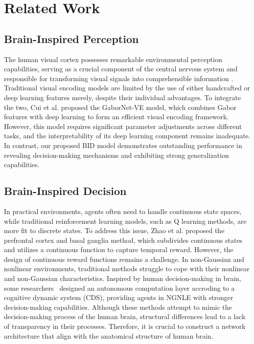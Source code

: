 \documentclass[preprint,12pt]{elsarticle}
\begin{document}
\section{Related Work}

\subsection{Brain-Inspired Perception}
\hspace{1pc}The human visual cortex possesses remarkable environmental perception capabilities, serving as a crucial component of the central nervous system and responsible for transforming visual signals into comprehensible information \cite{9134376}. 
Traditional visual encoding models are limited by the use of either handcrafted or deep learning features merely, despite their individual advantages\cite{kubilius2019brain}. 
To integrate the two, Cui et al. \cite{8574054} proposed the GaborNet-VE model, which combines Gabor features with deep learning to form an efficient visual encoding framework. 
However, this model requires significant parameter adjustments across different tasks, and the interpretability of its deep learning component remains inadequate\cite{liao2021statistical}. 
In contrast, our proposed BID model demonstrates outstanding performance in revealing decision-making mechanisms and exhibiting strong generalization capabilities.

\subsection{Brain-Inspired Decision}
\hspace{1pc}In practical environments, agents often need to handle continuous state spaces, while traditional reinforcement learning models, such as Q learning methods, are more fit to discrete states\cite{xi2020automatic}. 
To address this issue, Zhao et al. \cite{zhao2018brain} proposed the prefrontal cortex and basal ganglia method, which subdivides continuous states and utilizes a continuous function to capture temporal reward. 
However, the design of continuous reward functions remains a challenge. 
In non-Gaussian and nonlinear environments, traditional methods struggle to cope with their nonlinear and non-Gaussian characteristics\cite{naghshvarianjahromi2020natural}. 
Inspired by human decision-making in brain, some researchers~\cite{dai2013dynamic} designed an autonomous computation layer accroding to a cognitive dynamic system (CDS), providing agents in NGNLE with stronger decision-making capabilities. 
Although these methods attempt to mimic the decision-making process of the human brain, structural differences lead to a lack of transparency in their processes. 
Therefore, it is crucial to construct a network architecture that align with the anatomical structure of human brain.
\end{document}
